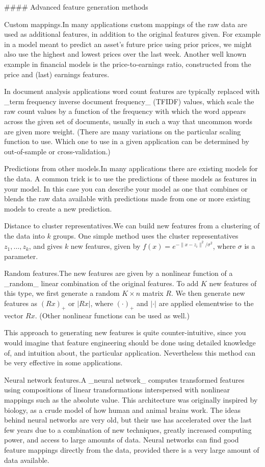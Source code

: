 

#### Advanced feature generation methods

Custom mappings.In many applications custom mappings of the raw data are used as additional features, in addition to the original features given. For example in a model meant to predict an asset's future price using prior prices, we might also use the highest and lowest prices over the last week. Another well known example in financial models is the price-to-earnings ratio, constructed from the price and (last) earnings features.

In document analysis applications word count features are typically replaced with _term frequency inverse document frequency_ (TFIDF) values, which scale the raw count values by a function of the frequency with which the word appears across the given set of documents, usually in such a way that uncommon words are given more weight. (There are many variations on the particular scaling function to use. Which one to use in a given application can be determined by out-of-sample or cross-validation.)

Predictions from other models.In many applications there are existing models for the data. A common trick is to use the predictions of these models as features in your model. In this case you can describe your model as one that combines or blends the raw data available with predictions made from one or more existing models to create a new prediction.

Distance to cluster representatives.We can build new features from a clustering of the data into \(k\) groups. One simple method uses the cluster representatives \(z_{1},\ldots,z_{k}\), and gives \(k\) new features, given by \(f(x)=e^{-\|x-z_{i}\|^{2}/\sigma^{2}}\), where \(\sigma\) is a parameter.

Random features.The new features are given by a nonlinear function of a _random_ linear combination of the original features. To add \(K\) new features of this type, we first generate a random \(K\times n\) matrix \(R\). We then generate new features as \((Rx)_{+}\) or \(|Rx|\), where \((\cdot)_{+}\) and \(|\cdot|\) are applied elementwise to the vector \(Rx\). (Other nonlinear functions can be used as well.)

This approach to generating new features is quite counter-intuitive, since you would imagine that feature engineering should be done using detailed knowledge of, and intuition about, the particular application. Nevertheless this method can be very effective in some applications.

Neural network features.A _neural network_ computes transformed features using compositions of linear transformations interspersed with nonlinear mappings such as the absolute value. This architecture was originally inspired by biology, as a crude model of how human and animal brains work. The ideas behind neural networks are very old, but their use has accelerated over the last few years due to a combination of new techniques, greatly increased computing power, and access to large amounts of data. Neural networks can find good feature mappings directly from the data, provided there is a very large amount of data available.

